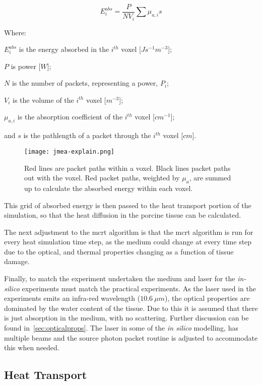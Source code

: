 \begin{equation}
E_{i}^{abs} = \frac{P}{N V_i}\sum\mu_{a,i} s
\label{eqn:Eabs}
\end{equation}

\noindent Where:

	\indent $E_i^{abs}$ is the energy absorbed in the $i^{th}$ voxel [$Js^{-1}m^{-3}$];
	
	\indent $P$ is power [$W$];
	
	\indent $N$ is the number of packets, representing a power, $P_i$;
	
	\indent $V_i$ is the volume of the $i^{th}$ voxel [$m^{-3}$];
	
	\indent $\mu_{a,i}$ is the absorption coefficient of the $i^{th}$ voxel [$cm^{-1}$];
	
	\indent and $s$ is the pathlength of a packet through the $i^{th}$ voxel [$cm$].
	
	\medskip
	
\begin{figure}[!htbp]
\centering
\texttt{[image: jmea-explain.png]}
\caption{Red lines are packet paths within a voxel. Black lines packet paths out with the voxel. Red packet paths, weighted by $\mu_a$, are summed up to calculate the absorbed energy within each voxel.}
\label{fig:jmea-explain}
\end{figure}	
		
This grid of absorbed energy is then passed to the heat transport portion of the simulation, so that the heat diffusion in the porcine tissue can be calculated.

The next adjustment to the \gls*{mcrt} algorithm is that the \gls*{mcrt} algorithm is run for every heat simulation time step, as the medium could change at every time step due to the optical, and thermal properties changing as a function of tissue damage.

Finally, to match the experiment undertaken the medium and laser for the \textit{in-silico} experiments must match the practical experiments. As the laser used in the experiments emits an infra-red wavelength ($10.6~\mu m$), the optical properties are dominated by the water content of the tissue. Due to this it is assumed that there is just absorption in the medium, with no scattering. Further discussion can be found in~\cref{sec:opticalprops}. The laser in some of the \textit{in silico} modelling, has multiple beams and the source photon packet routine is adjusted to accommodate this when needed.

\subsection{Heat Transport}

